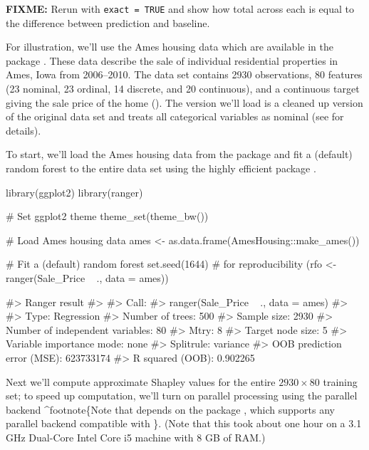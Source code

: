 \textbf{FIXME:} Rerun with \texttt{exact\ =\ TRUE} and show how total
across each is equal to the difference between prediction and baseline.

For illustration, we'll use the Ames housing data \citep{ames-cock-2011}
which are available in the  package
\citep{R-AmesHousing}. These data describe the sale of individual
residential properties in Ames, Iowa from 2006--2010. The data set
contains 2930 observations, 80 features (23 nominal, 23 ordinal, 14
discrete, and 20 continuous), and a continuous target giving the sale
price of the home (). The version we'll load is a
cleaned up version of the original data set and treats all categorical
variables as nominal (see  for details).

To start, we'll load the Ames housing data from the
 package \citep{R-AmesHousing} and fit a (default)
random forest to the entire data set using the highly efficient
 package \citep{R-ranger}.

\begin{Schunk}
\begin{Sinput}
library(ggplot2)
library(ranger)

# Set ggplot2 theme
theme_set(theme_bw())

# Load Ames housing data
ames <- as.data.frame(AmesHousing::make_ames())

# Fit a (default) random forest
set.seed(1644)  # for reproducibility
(rfo <- ranger(Sale_Price ~ ., data = ames))
\end{Sinput}
\begin{Soutput}
#> Ranger result
#> 
#> Call:
#>  ranger(Sale_Price ~ ., data = ames) 
#> 
#> Type:                             Regression 
#> Number of trees:                  500 
#> Sample size:                      2930 
#> Number of independent variables:  80 
#> Mtry:                             8 
#> Target node size:                 5 
#> Variable importance mode:         none 
#> Splitrule:                        variance 
#> OOB prediction error (MSE):       623733174 
#> R squared (OOB):                  0.902265
\end{Soutput}
\end{Schunk}

Next we'll compute approximate Shapley values for the entire
\(2930 \times 80\) training set; to speed up computation, we'll turn on
parallel processing using the  parallel backend
\citep{R-doParallel}\^{}footnote\{Note that  depends on
the  package \citep{R-plyr}, which supports any parallel
backend compatible with  \citep{R-foreach}\}. (Note
that this took about one hour on a 3.1 GHz Dual-Core Intel Core i5
machine with 8 GB of RAM.)

